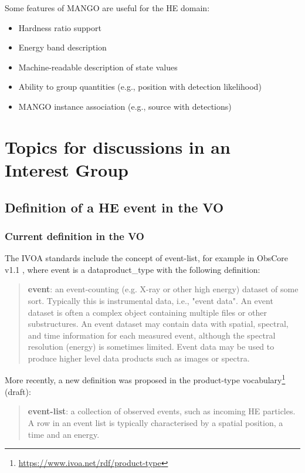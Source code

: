 \documentclass[11pt,a4paper]{ivoa}
\begin{document}
{Some features of MANGO are useful for the \gls{HE} domain:
 \begin{itemize}
     \item Hardness ratio support
     \item Energy band description
     \item Machine-readable description of state values
     \item Ability to group quantities (e.g., position with detection likelihood)
     \item MANGO instance association (e.g., source with detections)
\end{itemize}


\section{Topics for discussions in an Interest Group}

\subsection{Definition of a HE event in the VO}
\label{sec:event-bundlle-or-list}

\subsubsection{Current definition in the VO}

The \gls{IVOA} standards include the concept of event-list, for example in ObsCore v1.1 \citep{2017ivoa.spec.0509L}, where
event is a dataproduct\_type with the following definition:
\begin{quote}
    \textbf{event}: an event-counting (e.g. X-ray or other high energy) dataset of some sort. Typically this is
    instrumental data, i.e., "event data". An event dataset is often a complex object containing multiple files or
    other substructures. An event dataset may contain data with spatial, spectral, and time information for each
    measured event, although the spectral resolution (energy) is sometimes limited. Event data may be used to produce
    higher level data products such as images or spectra.
\end{quote}

More recently, a new definition was proposed in the product-type vocabulary\footnote{\url{https://www.ivoa.net/rdf/product-type}} (draft):
\begin{quote}
    \textbf{event-list}: a collection of observed events, such as incoming \gls{HE} particles. A row in an event
    list is typically characterised by a spatial position, a time and an energy.
\end{quote}

}
\end{document}
